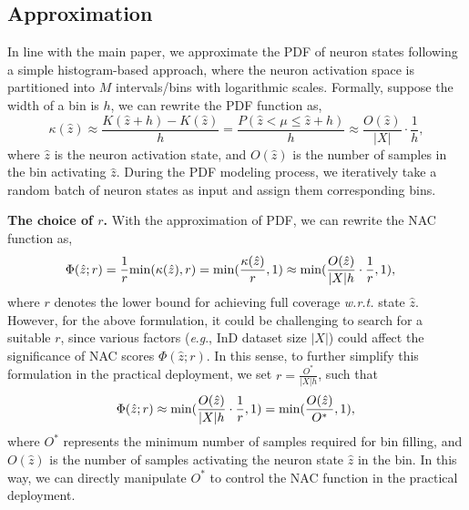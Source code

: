 \documentclass{article} \usepackage{iclr2024_conference,times}
\newcommand{\eg}{\textit{e}.\textit{g}.}
\newcommand{\bfstart}[1]{\noindent\textbf{#1.}}
\begin{document}
\subsection{Approximation}
\label{Sec:Appendix:Approx}
In line with the main paper, we approximate the PDF of neuron states following a simple histogram-based approach, where the neuron activation space is partitioned into  $M$ intervals/bins with logarithmic scales. Formally, suppose the width of a bin is $h$, we can rewrite the PDF function as,
\begin{equation}
	\kappa(\hat{z}) \approx \frac{{K}(\hat{z}+h) - {K}(\hat{z})}{h} 
	= \frac{P(\hat{z} < \mu \leq \hat{z}+h)}{h}
	\approx \frac{{O}(\hat{z})}{|X|} \cdot \frac{1}{h},
\end{equation}
\vspace{-1mm}
where $\hat{z}$ is the neuron activation state, and ${ O}(\hat{z})$ is the number of samples in the bin activating $\hat{z}$. During the PDF modeling process, we iteratively take a random batch of neuron states as input and assign them corresponding bins.


\bfstart{The choice of $r$}
With the approximation of PDF, we can rewrite the NAC function as,
\begin{equation}
	\begin{aligned}
		\Phi(\hat{z};r) &= \frac{1}{r}{\rm min}(\kappa(\hat{z}), r) = {\rm min}(\frac{\kappa(\hat{z})}{r} , 1) 
		\approx {\rm min}(\frac{{O}(\hat{z})}{|X|h} \cdot \frac{1}{r},1 ),
	\end{aligned}
\end{equation}
where $r$ denotes the lower bound for achieving full coverage \textit{w.r.t.} state $\hat{z}$. 
However, for the above formulation, it could be challenging to search for a suitable $r$, since various factors (\eg, InD dataset size $|X|$) could affect the significance of NAC scores $\Phi(\hat{z};r)$.
In this sense, to further simplify this formulation in the practical deployment, we set $r = \frac{O^*}{|X|h}$, such that 
\begin{equation}
	\Phi(\hat{z};r) \approx {\rm min}(\frac{{O}(\hat{z})}{|X|h} \cdot \frac{1}{r},1 ) =  
	{\rm min}(\frac{{O}(\hat{z})}{O^*},1 ),\\
\end{equation}
where $O^*$ represents the minimum number of samples required for bin filling, and ${O}(\hat{z})$ is the number of samples activating the neuron state $\hat{z}$ in the bin. In this way, we can directly manipulate $O^*$ to control the NAC function in the practical deployment.
\end{document}
